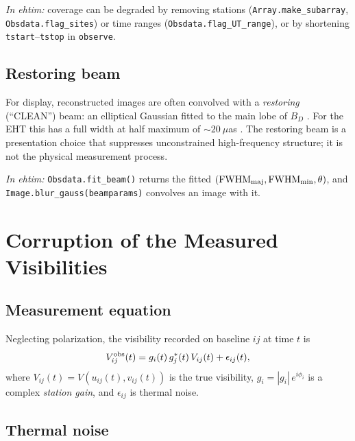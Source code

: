 \documentclass[11pt]{article}
\newcommand{\ehtimnote}[1]{%
  \par\smallskip\noindent
  \colorbox{gray!12}{\parbox{\dimexpr\linewidth-2\fboxsep}{\small\textit{In ehtim:} #1}}%
  \par\smallskip}
\begin{document}
\ehtimnote{coverage can be degraded by removing stations
(\texttt{Array.make\_subarray}, \texttt{Obsdata.flag\_sites}) or time ranges
(\texttt{Obsdata.flag\_UT\_range}), or by shortening \texttt{tstart}--\texttt{tstop}
in \texttt{observe}.}

\subsection{Restoring beam}

For display, reconstructed images are often convolved with a
\emph{restoring} (``CLEAN'') beam: an elliptical Gaussian fitted to the main
lobe of $B_D$ \cite{Hogbom1974}. For the EHT this has a full width at half
maximum of $\sim 20~\mu$as \cite{EHT2019IV}. The restoring beam is a
presentation choice that suppresses unconstrained high-frequency structure;
it is not the physical measurement process.

\ehtimnote{\texttt{Obsdata.fit\_beam()} returns the fitted
$(\text{FWHM}_{\rm maj}, \text{FWHM}_{\rm min}, \theta)$, and
\texttt{Image.blur\_gauss(beamparams)} convolves an image with it.}

\section{Corruption of the Measured Visibilities}

\subsection{Measurement equation}

Neglecting polarization, the visibility recorded on baseline $ij$ at time $t$
is
\begin{equation}
V_{ij}^{\rm obs}(t) = g_i(t)\,g_j^*(t)\,V_{ij}(t) + \epsilon_{ij}(t),
\label{eq:rime}
\end{equation}
where $V_{ij}(t) = V(u_{ij}(t), v_{ij}(t))$ is the true visibility,
$g_i = |g_i|\,e^{i\phi_i}$ is a complex \emph{station gain}, and
$\epsilon_{ij}$ is thermal noise.

\subsection{Thermal noise}
\end{document}
